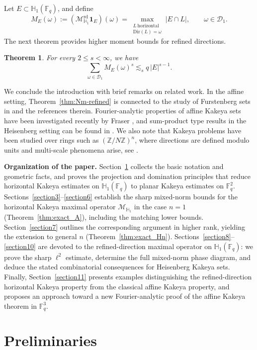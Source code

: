 \documentclass[11pt]{article}
\newtheorem{theorem}{Theorem}[section]
\newcommand{\1}{\mathbf 1}
\begin{document}
Let $E\subset \mathbb H_1(\mathbb F_q)$, and define
\[
M_E(\omega):=
(\mathcal M^{\mathrm{rd}}_{\mathbb H_1}\mathbf 1_E)(\omega)
=
\max_{\substack{L\ \mathrm{horizontal}\\ \mathrm{Dir}(L)=\omega}}
|E\cap L|,
\qquad \omega\in\mathcal D_1.
\]
The next theorem provides higher moment bounds for refined directions.
\begin{theorem}\label{co-1mar}
For every $2\le s<\infty$, we have
\[
\sum_{\omega\in\mathcal D_1} M_E(\omega)^s
\lesssim_{s} q\,|E|^{s-1}.
\]
\end{theorem}
We conclude the introduction with brief remarks on related work. In the affine setting, Theorem~\ref{thm:Nm-refined} is connected to the study of Furstenberg sets in \cite{F1, F2} and the references therein. Fourier-analytic properties of affine Kakeya sets have been investigated recently by Fraser \cite{Fraser25}, and sum-product type results in the Heisenberg setting can be found in \cite{HH12, HH13, HH18, HH19}. We also note that Kakeya problems have been studied over rings such as $(\mathbb{Z}/N\mathbb{Z})^n$, where directions are defined modulo units and multi-scale phenomena arise, see \cite{Ars21, Dha24, DD21, DH13, HW18}.

\noindent\textbf{Organization of the paper.}
Section~\ref{section2} collects the basic notation and geometric facts, and proves the projection and domination principles that reduce horizontal Kakeya estimates on $\mathbb H_1(\mathbb F_q)$ to planar Kakeya estimates on $\mathbb F_q^2$.
Sections~\ref{section3}--\ref{section6} establish the sharp mixed-norm bounds for the horizontal Kakeya maximal operator $\mathcal{M}_{\mathbb H_1}$ in the case $n=1$ (Theorem~\ref{thm:exact_A}), including the matching lower bounds.
Section~\ref{section7} outlines the corresponding argument in higher rank, yielding the extension to general $n$ (Theorem~\ref{thm:exact_Hn}).
Sections~\ref{section8}--\ref{section10} are devoted to the refined-direction maximal operator on $\mathbb H_1(\mathbb F_q)$: we prove the sharp $\ell^2$ estimate, determine the full mixed-norm phase diagram, and deduce the stated combinatorial consequences for Heisenberg Kakeya sets.
Finally, Section~\ref{section11} presents examples distinguishing the refined-direction horizontal Kakeya property from the classical affine Kakeya property, and proposes an approach toward a new Fourier-analytic proof of the affine Kakeya theorem in $\mathbb{F}_q^3$.




\section{Preliminaries}\label{section2}
\end{document}
